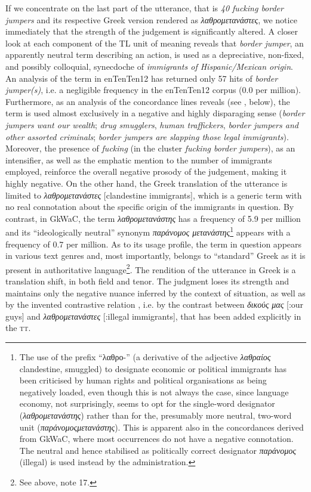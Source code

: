 \documentclass[output=paper]{LSP/langsci}
\begin{document}
If we concentrate on the last part of the utterance, that is \textit{40 fucking border jumpers} and its respective Greek version rendered as\textit{ λαθρομετανάστες}, we notice immediately that the strength of the judgement is significantly altered. A closer look at each component of the TL unit of meaning reveals that \textit{border jumper}, an apparently neutral term describing an action, is used as a depreciative, non-fixed, and possibly colloquial, synecdoche of \textit{immigrants of Hispanic/Mexican origin}. An analysis of the term in enTenTen12 has returned only 57 hits of \textit{border jumper(s)}, i.e. a negligible frequency in the enTenTen12 corpus (0.0 per million). Furthermore, as an analysis of the concordance lines reveals (see , below), the term is used almost exclusively in a negative and highly disparaging sense (\textit{border jumpers want our wealth}; \textit{drug smugglers}, \textit{human traffickers}, \textit{border jumpers and other assorted criminals}; \textit{border jumpers are slapping those legal immigrants}). Moreover, the presence of \textit{fucking} (in the cluster \textit{fucking border jumpers}), as an intensifier, as well as the emphatic mention to the number of immigrants employed, reinforce the overall negative prosody of the judgement, making it highly negative. On the other hand, the Greek translation of the utterance is limited to \textit{λαθρομετανάστες} [clandestine immigrants], which is a generic term with no real connotation about the specific origin of the immigrants in question. By contrast, in GkWaC, the term \textit{λαθρομετανάστης} has a frequency of 5.9 per million and its “ideologically neutral” synonym \textit{παράνομος μετανάστης}\footnote{The use of the prefix “λαθρο-” (a derivative of the adjective \textit{λαθραίος} {clandestine, smuggled}) to designate economic or political immigrants has been criticised by human rights and political organisations as being negatively loaded, even though this is not always the case, since language economy, not surprisingly, seems to opt for the single-word designator (\textit{λαθρομετανάστης}) rather than for the, presumably more neutral, two-word unit (\textit{παράνομοςμετανάστης}). This is apparent also in the concordances derived from GkWaC, where most occurrences do not have a negative connotation. The neutral and hence stabilised as politically correct designator \textit{παράνομος} (illegal) is used instead by the administration.} appears with a frequency of 0.7 per million. As to its usage profile, the term in question appears in various text genres and, most importantly, belongs to “standard” Greek as it is present in authoritative language\footnote{See above, note 17.}. The rendition of the utterance in Greek is a translation shift, in both field and tenor. The judgment loses its strength and maintains only the negative nuance inferred by the context of situation, as well as by the invented contrastive relation \citep[87--89]{Fairclough2003}, i.e. by the contrast between \textit{δικούς μας} [:our guys] and \textit{λαθρομετανάστες} [:illegal immigrants], that has been added explicitly in the \textsc{tt}.
\end{document}
